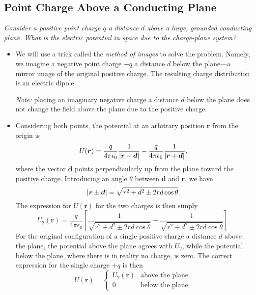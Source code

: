 \documentclass[11pt, a4paper]{article}
\renewcommand{\vec}[1]{\bm{#1}} %
\renewcommand{\r}{\vec{r}}
\newcommand{\ee}{\epsilon_{0}}  %
\begin{document}
\subsection{Point Charge Above a Conducting Plane}
\textit{Consider a positive point charge $ q $ a distance $ d $ above a large, grounded conducting plane. What is the electric potential in space due to the charge-plane system?}
\begin{itemize}
	\item We will use a trick called the \textit{method of images} to solve the problem. 
	Namely, we imagine a negative point charge $ -q $ a distance $ d $ below the plane---a mirror image of the original positive charge. The resulting charge distribution is an electric dipole. 
	
	\textit{Note:} placing an imaginary negative charge a distance $ d $ below the plane does not change the field above the plane due to the positive charge. 
	
	\item Considering both points, the potential at an arbitrary position $ \r $ from the origin is
	\begin{equation*}
		U(\r) = \frac{q}{4\pi \ee}\frac{1}{\abs{\r - \vec{d}}} - \frac{q}{4\pi \ee}\frac{1}{\abs{\r + \vec{d}}},
	\end{equation*}
	where the vector $ \vec{d} $ points perpendicularly up from the plane toward the positive charge. Introducing an angle $ \theta $ between $ \vec{d} $ and $ \r $, we have
	\begin{equation*}
		\abs{\r \pm \vec{d}} = \sqrt{r^{2}+d^{2} \pm 2rd\cos \theta}.
	\end{equation*}
	The expression for $ U(\r) $ for the two charges is then simply
	\begin{equation*}
		U_{2}(\r) = \frac{q}{4\pi \ee}\left[\frac{1}{\sqrt{r^{2}+d^{2} \pm 2rd\cos \theta}} - \frac{1}{\sqrt{r^{2}+d^{2} \pm 2rd\cos \theta}}\right].
	\end{equation*}
	For the original configuration of a single positive charge a distance $ d $ above the plane, the potential above the plane agrees with $ U_{2} $, while the potential below the plane, where there is in reality no charge, is zero. The correct expression for the single charge $ +q $ is then
	\begin{equation*}
		U(\r) = 
		\begin{cases}
			U_{2}(\r) & \text{above the plane}\\
			0 & \text{below the plane}
		\end{cases}.
	\end{equation*}
	

\end{itemize}
\end{document}
